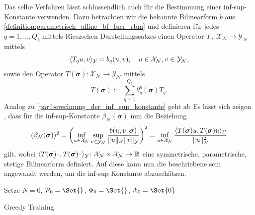 \documentclass[../main.tex]{subfiles}
\begin{document}
Das selbe Verfahren lässt schlussendlich auch für die Bestimmung einer inf-sup-Konstante verwenden.
Dazu betrachten wir die bekannte Bilinearform $b$ aus \cref{definition:parametrisch_affine_bf_fuer_rbm} und definieren für jedes $q = 1, \dots, Q_{b}$ mittels Rieszschen Darstellungssatzes einen Operator $T_{q} \colon \mathcal X_{\mathcal N} \to \mathcal Y_{\mathcal N}$ mittels
\begin{equation}
    \langle T_{q} u,v\rangle_{\mathcal Y} = b_{q}(u, v), \quad u \in \mathcal X_{\mathcal N}, v \in \mathcal Y_{\mathcal N},
\end{equation}
sowie den Operator $T(\bm \sigma) \colon \mathcal X_{\mathcal N} \to \mathcal Y_{\mathcal N}$ mittels
\begin{equation}
    T(\bm \sigma) := \sum_{q = 1}^{Q_b} \theta_{q}^{b}(\bm \sigma) T_{q}.
\end{equation}
Analog zu \cref{par:berechnung_der_inf_sup_konstante} geht ab
Es lässt sich zeigen \cite[476]{Huynh2007}, dass für die inf-sup-Konstante $\beta_{\mathcal N}(\bm \sigma)$ nun die Beziehung
\begin{equation}
    (\beta_{\mathcal N}(\bm \sigma))^{2}
    = \left( \inf_{u \in \mathcal X_{\mathcal N}} \sup_{v \in \mathcal Y_{\mathcal N}} \frac{b(u, v; \bm \sigma)}{\lVert u\rVert_{\mathcal X} \lVert v\rVert_{\mathcal Y}} \right)^{2}
    = \inf_{u \in \mathcal X_{\mathcal N}} \frac{\langle T(\bm \sigma)u,T(\bm \sigma)u\rangle_{\mathcal Y}}{\lVert u\rVert_{\mathcal X}^{2}}
\end{equation}
gilt, wobei $\langle T(\bm \sigma){\mkern2mu\cdot\mkern2mu},T(\bm \sigma){\mkern2mu\cdot\mkern2mu}\rangle_{\mathcal Y} \colon \mathcal X_{\mathcal N} \times \mathcal X_{\mathcal N} \to \mathbb{R}$ eine symmetrische, parametrische, stetige Bilinearform definiert.
Auf diese kann nun die beschriebene \acl{scm} angewandt werden, um die inf-sup-Konstante abzuschätzen.




\clearpage

\begin{algorithm}[tb]
    \DontPrintSemicolon
    \BlankLine
    Setze $N = 0$, $\mathcal P_{0} = \Set{}$, $\Phi_{0} = \Set{}$, $\mathcal X_{0} = \Set{0}$\;
    \caption{Greedy Training}
    \label{algorithm:greedy_training}
\end{algorithm}
\end{document}

